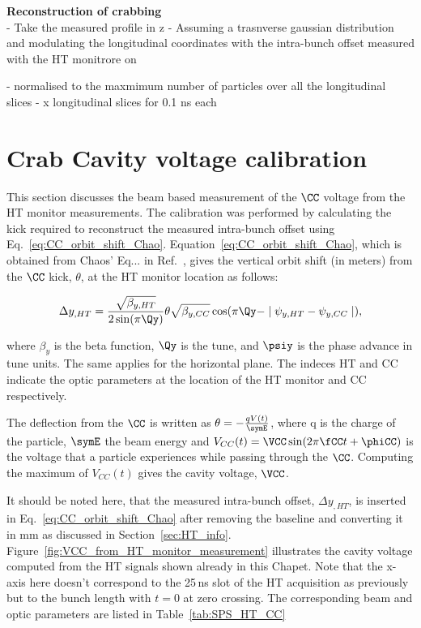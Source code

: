 \normalsize{\textbf{Reconstruction of crabbing}}\\

- Take the measured profile in z
- 
Assuming a trasnverse gaussian distribution and modulating the longitudinal coordinates with the intra-bunch offset measured with the HT monitrore on

- normalised to the maxmimum number of particles over all the longitudinal slices
- x longitudinal slices for 0.1 ns each


 \section{Crab Cavity voltage calibration}\label{sec:Vcc_calibration}

 This section discusses the beam based measurement of the $\CC$ voltage from the HT monitor measurements. The calibration was performed by calculating the kick required to reconstruct the measured intra-bunch offset using Eq.~\eqref{eq:CC_orbit_shift_Chao}. Equation~\eqref{eq:CC_orbit_shift_Chao}, which is obtained from Chaos' Eq... in Ref.~\cite{Chao:1490001}, gives the vertical orbit shift (in meters) from the $\CC$ kick, $\theta$, at the HT monitor location as follows:


\begin{equation}\label{eq:CC_orbit_shift_Chao}
   \Delta y_{,HT} = \frac{\sqrt{\beta_{y, HT}}}{2 \sin(\pi \Qy)} \theta \sqrt{\beta_{y, CC}} \cos(\pi \Qy - \mid \psi_{y, HT} - \psi_{y, CC} \mid),
\end{equation}

where $\beta_y$ is the beta function, $\Qy$ is the tune, and $\psiy$ is the phase advance in tune units. The same applies for the horizontal plane. The indeces HT and CC indicate the optic parameters at the location of the HT monitor and CC respectively.

The deflection from the $\CC$ is written as $\theta = - \frac{q V(t)}{\symE}$, where q is the charge of the particle, $\symE$ the beam energy and $V_{CC}(t) = \VCC \sin(2 \pi \fCC t + \phiCC) $ is the voltage that a particle experiences while passing through the $\CC$. Computing the maximum of $V_{CC}(t)$ gives the cavity voltage, $\VCC$. 

It should be noted here, that the measured intra-bunch offset, $\Delta y_{, HT}$, is inserted in Eq.~\eqref{eq:CC_orbit_shift_Chao} after removing the baseline and converting it in mm as discussed in Section~\ref{sec:HT_info}. Figure~\ref{fig:VCC_from_HT_monitor_measurement} illustrates the cavity voltage computed from the HT signals shown already in this Chapet. Note that the x-axis here doesn't correspond to the 25\,ns slot of the HT acquisition as previously but to the bunch length with $t=0$ at zero crossing. The corresponding beam and optic parameters are listed in Table~\ref{tab:SPS_HT_CC}


